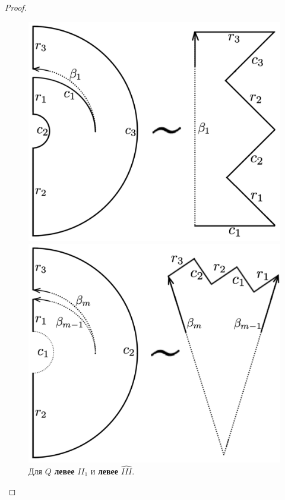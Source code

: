 \begin{proof}
\begin{figure}[!htb]
\centering
\includegraphics[scale=0.1]{images/ch4/section3_circular/atoms/branching/terminal_min_transformed_2.pdf}
    \caption{Для $Q$ \textbf{левее} $II_1$ и \textbf{левее} $\widehat{III}$.}
    \label{fig:pt10:_terminal_min_domain_2}
\endminipage\hfill
{}
\centering
\includegraphics[scale=0.1]{images/ch4/section3_circular/atoms/branching/branching_domain_transformed_2.pdf}

\end{figure}
\end{proof}
